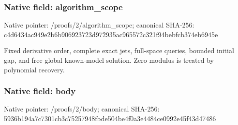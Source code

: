 \documentclass[10pt,a4paper]{article}
\begin{document}
\subsubsection{Native field: algorithm\_\allowbreak{}scope}
Native pointer: /proofs/2/algorithm\_\allowbreak{}scope; canonical SHA-256: c4d6434ac949e2b6b906923723d972935ac965572c321f94bebfcb374eb6945e

\begingroup\raggedright\sloppy Fixed derivative order,\allowbreak{} complete exact jets,\allowbreak{} full-space queries,\allowbreak{} bounded initial gap,\allowbreak{} and free global known-model solution. Zero modulus is treated by polynomial recovery.\par\endgroup

\subsubsection{Native field: body}
Native pointer: /proofs/2/body; canonical SHA-256: 5936b194a7c7301cb3c75257948fbde504be4f0a3e4484ce0992e45f43d47486
\end{document}
